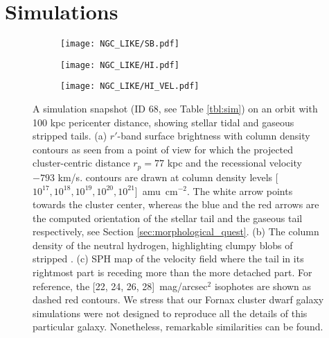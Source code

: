 

\section{Simulations} \label{sec:simulations}
\begin{figure}
\centering
\begin{subfigure}[b]{0.49\textwidth}
 \centering
 \texttt{[image: NGC\_LIKE/SB.pdf]}
 \caption{}
 \label{fig:sb_arrows}
\end{subfigure}
 \hfill
  \begin{subfigure}[b]{0.5\textwidth}
  \texttt{[image: NGC\_LIKE/HI.pdf]}
  \caption{}
  \label{fig:sim_hi_density}
\end{subfigure}
\hfill
\begin{subfigure}[b]{0.5\textwidth}
  \centering
  \texttt{[image: NGC\_LIKE/HI\_VEL.pdf]}
  \caption{}
  \label{fig:sim_hi_kin}
\end{subfigure}
 \vfill
\caption{A simulation snapshot (ID 68, see Table \ref{tbl:sim}) on an orbit with 100 kpc pericenter distance, showing stellar tidal and gaseous stripped tails.
(a) $r'$-band surface brightness with \Hi{} column density contours as seen from a point of view for which the projected cluster-centric distance $r_p = 77$ kpc and the recessional velocity $-793$ km/s.
\Hi{} contours are drawn at column density levels [$10^{17}, 10^{18}, 10^{19}, 10^{20}, 10^{21}$]~amu~cm$^{-2}$. The white arrow points towards the cluster center, whereas the blue and the red arrows are the computed orientation of the stellar tail and the gaseous tail respectively, see Section \ref{sec:morphological_quest}.
(b) The column density of the neutral hydrogen, highlighting clumpy blobs of stripped \Hi{}.
(c) SPH map of the \Hi{} velocity field where the \Hi{} tail in its rightmost part is receding more than the more detached part.
For reference, the [22, 24, 26, 28]~mag/arcsec$^2$ isophotes are shown as dashed red contours.
We stress that our Fornax cluster dwarf galaxy simulations were not designed to reproduce all the details of this particular galaxy. Nonetheless, remarkable similarities can be found.}

\label{fig:selected_snapshot}
\end{figure}

